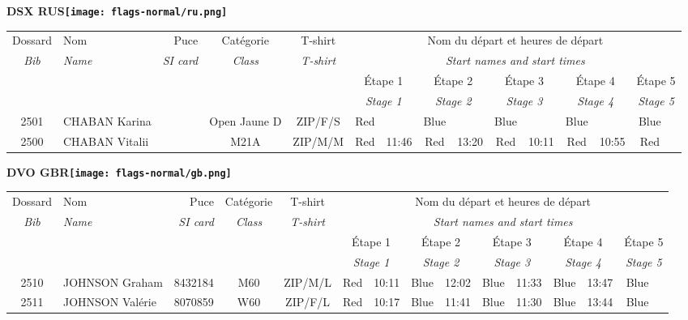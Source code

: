 \documentclass{report}
\begin{document}
\newpage
  \Huge \centering \bfseries DSX  RUS\normalfont \footnotesize \sffamily \hfill \texttt{[image: flags-normal/ru.png]} \newline 
  \begin{longtable}{|c|l|r|c|c|*{5}{cc|}}
    Dossard & Nom  & Puce    & Catégorie & T-shirt & \multicolumn{10}{c|}{Nom du départ et heures de départ} \\
    \itshape Bib     & \itshape Name & \itshape SI card & \itshape Class  & \itshape  T-shirt  & \multicolumn{10}{c|}{\itshape Start names and start times} \\
    \hline
    & & & & & \multicolumn{2}{c|}{Étape 1} & \multicolumn{2}{c|}{Étape 2} & \multicolumn{2}{c|}{Étape 3} & \multicolumn{2}{c|}{Étape 4} & \multicolumn{2}{c|}{Étape 5} \\
    & & & & & \multicolumn{2}{c|}{\itshape Stage 1} & \multicolumn{2}{c|}{\itshape Stage 2} & \multicolumn{2}{c|}{\itshape Stage 3} & \multicolumn{2}{c|}{\itshape Stage 4} & \multicolumn{2}{c|}{\itshape Stage 5} \\
    \hline
    2501 & CHABAN Karina &  & Open Jaune D & ZIP/F/S & Red &   & Blue &   & Blue &   & Blue &   & Blue &  \\
    2500 & CHABAN Vitalii &  & M21A & ZIP/M/M & Red & 11:46 & Red & 13:20 & Red & 10:11 & Red & 10:55 & Red &  \\
  \end{longtable}
\newpage
  \Huge \centering \bfseries DVO  GBR\normalfont \footnotesize \sffamily \hfill \texttt{[image: flags-normal/gb.png]} \newline 
  \begin{longtable}{|c|l|r|c|c|*{5}{cc|}}
    Dossard & Nom  & Puce    & Catégorie & T-shirt & \multicolumn{10}{c|}{Nom du départ et heures de départ} \\
    \itshape Bib     & \itshape Name & \itshape SI card & \itshape Class  & \itshape  T-shirt  & \multicolumn{10}{c|}{\itshape Start names and start times} \\
    \hline
    & & & & & \multicolumn{2}{c|}{Étape 1} & \multicolumn{2}{c|}{Étape 2} & \multicolumn{2}{c|}{Étape 3} & \multicolumn{2}{c|}{Étape 4} & \multicolumn{2}{c|}{Étape 5} \\
    & & & & & \multicolumn{2}{c|}{\itshape Stage 1} & \multicolumn{2}{c|}{\itshape Stage 2} & \multicolumn{2}{c|}{\itshape Stage 3} & \multicolumn{2}{c|}{\itshape Stage 4} & \multicolumn{2}{c|}{\itshape Stage 5} \\
    \hline
    2510 & JOHNSON Graham & 8432184 & M60 & ZIP/M/L & Red & 10:11 & Blue & 12:02 & Blue & 11:33 & Blue & 13:47 & Blue &  \\
    2511 & JOHNSON Valérie & 8070859 & W60 & ZIP/F/L & Red & 10:17 & Blue & 11:41 & Blue & 11:30 & Blue & 13:44 & Blue &  \\
  \end{longtable}
\end{document}
